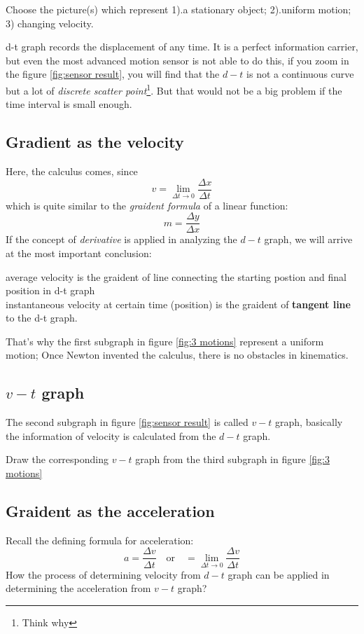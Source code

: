 \documentclass[a4paper]{tufte-handout}
\newenvironment{TaskBox} %
{\begin{tcolorbox}[breakable,colback=b1!30,colframe=b1,title=Task]} {\end{tcolorbox}}
\newenvironment{SummBox}
{\begin{tcolorbox}[breakable,colback=r1!30,colframe=r1,title=Summary]} {\end{tcolorbox}}
\begin{document}
\begin{TaskBox}
Choose the picture(s) which represent 1).a stationary object; 2).uniform motion; 3) changing velocity.
\end{TaskBox}


d-t graph records the displacement of any time. It is a perfect information carrier, but even the most advanced motion sensor is not able to do this, if you zoom in the figure \ref{fig:sensor result}, you will find that the $d-t$ is not a continuous curve but a lot of \emph{discrete scatter point}\footnote{Think why}. But that would not be a big problem if the time interval is small enough. 

\subsection{Gradient as the velocity}
Here, the calculus comes, since
\begin{equation*}
  v = \lim_{\Delta t\to 0 } \frac{\Delta x}{\Delta t}
\end{equation*}
which is quite similar to the \emph{graident formula} of a linear function:
\begin{equation*}
 m = \frac{\Delta y}{\Delta x}
\end{equation*}
If the concept of \emph{derivative} is applied in analyzing the $d-t$ graph, we will arrive at the most important conclusion:
\begin{SummBox}
average velocity is the graident of line connecting the starting postion and final position in d-t graph\\
instantaneous velocity at certain time (position) is the graident of \textbf{tangent line} to the d-t graph.
\end{SummBox}
That's why the first subgraph in figure \ref{fig:3 motions} represent a uniform motion; Once Newton invented the calculus, there is no obstacles in kinematics. 

\subsection{$v-t$ graph}
The second subgraph in figure \ref{fig:sensor result} is called $v-t$ graph, basically the information of velocity is calculated from the $d-t$ graph.
\begin{TaskBox}
Draw the corresponding $v-t$ graph from the third subgraph in figure \ref{fig:3 motions}
\end{TaskBox}

\subsection{Graident as the acceleration}
Recall the defining formula for acceleration:
\begin{equation*}
  a= \frac{\Delta v}{\Delta t} \quad \text{or} \quad = \lim_{\Delta t\to 0}\frac{\Delta v}{\Delta t}
\end{equation*}
How the process of determining velocity from $d-t$ graph can be applied in determining the acceleration from $v-t$ graph?
\end{document}

